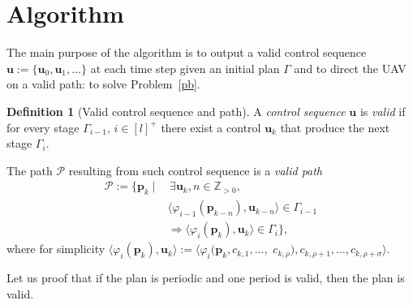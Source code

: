 \documentclass[letterpaper,10pt,conference]{ieeeconf}
\theoremstyle{definition}
\newtheorem{defn}{Definition}[section]
\begin{document}
\section{Algorithm}
\label{sec:algo}

The main purpose of the algorithm is to output a valid control sequence $\mathbf{u}:=\{\mathbf{u}_0,\mathbf{u}_1,\dots\}$ at each time step given an initial plan $\Gamma$ and to direct the UAV on a valid path: to solve Problem~\ref{pb}.

\begin{defn}[Valid control sequence and path]\label{def:valid}
  A \emph{control sequence} $\mathbf{u}$ is \emph{valid} if for every stage $\Gamma_{i-1},\,i\in[l]^+$ there exist a control $\mathbf{u}_k$ that produce the next stage $\Gamma_i$. 
  
  The path $\mathcal{P}$ resulting from such control sequence is a \emph{valid path}
  \begin{equation}\begin{split}\label{eq:mission-valid}
   \mathcal{P}:=\{\mathbf{p}_k\mid&\,\exists \mathbf{u}_k,n\in\mathbb{Z}_{>0},\\
    &\langle\varphi_{i-1}\left(\mathbf{p}_{k-n}\right),\mathbf{u}_{k-n}\rangle\in\Gamma_{i-1}\\
    &\Longrightarrow\langle\varphi_i(\mathbf{p}_{k}),\mathbf{u}_k\rangle\in\Gamma_i\},
  \end{split}\end{equation}
  where for simplicity $\langle\varphi_i(\mathbf{p}_{k}),\mathbf{u}_k\rangle:=\langle\varphi_i(\mathbf{p}_{k},c_{k,1},\dots,$ $c_{k,\rho}),c_{k,\rho+1},\dots,c_{k,\rho+\sigma}\rangle$.
\end{defn}

Let us proof that if the plan is periodic and one period is valid, then the plan is valid.
\end{document}
